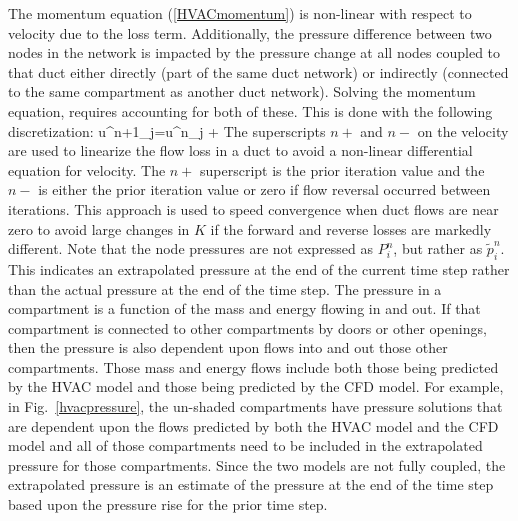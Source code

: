The momentum equation (\ref{HVACmomentum}) is non-linear with respect to velocity due to
the loss term.  Additionally, the pressure difference between two nodes in the network is impacted by the pressure change at all
nodes coupled to that duct either directly (part of the same duct network) or indirectly (connected to the same compartment as another duct network).
Solving the momentum equation, requires accounting for both of these.  This is done with the following discretization:
\be u^{n+1}_j=u^{n}_j +   \label{HVACdiscretemomentum} \ee
The superscripts $n+$ and $n-$ on the velocity are used to linearize the flow loss in a duct to avoid a non-linear differential equation for velocity.
The $n+$ superscript is the prior iteration value and the $n-$ is either the prior iteration value or zero if flow reversal occurred between iterations.
This approach is used to speed convergence when duct flows are near zero to avoid large changes in $K$ if the forward and reverse losses are markedly different.
Note that the node pressures are not expressed as $P^n_i$, but rather as $\tilde{p}^n_i$.  This indicates an extrapolated pressure at the end of the current time step
rather than the actual pressure at the end of the time step.  The pressure in a compartment is a function of the mass and energy flowing in and out.
If that compartment is connected to other compartments by doors or other openings, then the pressure is also dependent upon flows into and out those other compartments.
Those mass and energy flows include both those being predicted by the HVAC model and those being predicted by the CFD model.
For example, in Fig.~\ref{hvacpressure}, the un-shaded compartments have pressure solutions that are dependent upon the flows predicted by both the
HVAC model and the CFD model and all of those compartments need to be included in the extrapolated pressure for those compartments.
Since the two models are not fully coupled, the extrapolated pressure is an estimate of the pressure at the end of the time step based upon the pressure rise for the prior time step.

